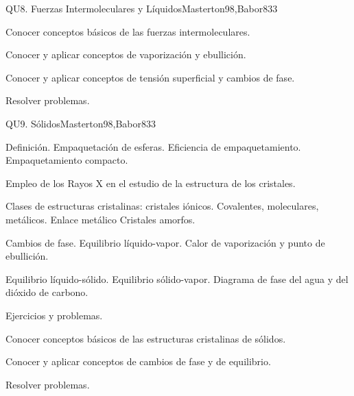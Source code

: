 \begin{syllabus}
\begin{unit}{QU8. Fuerzas Intermoleculares y Líquidos}{Masterton98,Babor83}{3}
   \begin{learningoutcomes}
      \item Conocer conceptos básicos de las fuerzas intermoleculares.
      \item Conocer y aplicar conceptos de vaporización y ebullición.
      \item Conocer y aplicar conceptos de tensión superficial y cambios de fase.
      \item Resolver problemas.
   \end{learningoutcomes}
\end{unit}

\begin{unit}{QU9. Sólidos}{Masterton98,Babor83}{3}
\begin{topics}
      \item Definición. Empaquetación de esferas. Eficiencia de empaquetamiento. Empaquetamiento compacto.
      \item Empleo de los Rayos X en el estudio de la estructura de los cristales.
      \item Clases de estructuras cristalinas: cristales iónicos. Covalentes, moleculares, metálicos. Enlace metálico Cristales amorfos.
      \item Cambios de fase. Equilibrio líquido-vapor. Calor de vaporización y punto de ebullición.
      \item Equilibrio líquido-sólido. Equilibrio sólido-vapor. Diagrama de fase  del agua y del dióxido de carbono.
      \item Ejercicios y problemas.
    \end{topics}

   \begin{learningoutcomes}
      \item Conocer conceptos básicos de las estructuras cristalinas de sólidos.
      \item Conocer y aplicar conceptos de cambios de fase y de equilibrio.
      \item Resolver problemas.
   \end{learningoutcomes}
\end{unit}


\end{syllabus}
